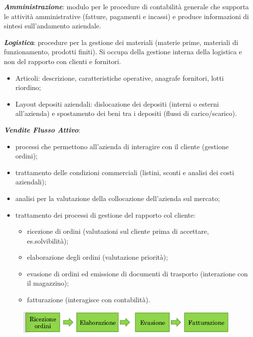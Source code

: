 \documentclass[a4paper, notitlepage, 9pt]{extreport}
\begin{document}
\noindent
\textit{\textbf{Amministrazione}}: modulo per le procedure di contabilità generale che supporta le attività amministrative (fatture, pagamenti e incassi) e produce informazioni di sintesi sull’andamento aziendale.

\noindent
\textit{\textbf{Logistica}}: procedure per la gestione dei materiali (materie prime, materiali di funzionamento, prodotti finiti). Si occupa della gestione interna della logistica e non del rapporto con clienti e fornitori.
\begin{itemize}
	\item Articoli: descrizione, caratteristiche operative, anagrafe fornitori, lotti riordino;
	\item Layout depositi aziendali: dislocazione dei depositi (interni o esterni all'azienda) e spostamento dei beni tra i depositi (flussi di carico/scarico).
\end{itemize}

\noindent
\textit{\textbf{Vendite Flusso Attivo}}:
	\begin{itemize}
		\item processi che permettono all’azienda di interagire con il cliente (gestione ordini);
		\item trattamento delle condizioni commerciali (listini, sconti e analisi dei costi aziendali);
		\item analisi per la valutazione della collocazione
		dell’azienda sul mercato;
		\item trattamento dei processi di gestione del rapporto col cliente:
		\begin{itemize}
			\item ricezione di ordini (valutazioni sul cliente prima di accettare, es.solvibilità);
			\item elaborazione degli ordini (valutazione priorità);
			\item evasione di ordini ed emissione di documenti di trasporto (interazione con il magazzino);
			\item fatturazione (interagisce con contabilità).
		\end{itemize}
	\end{itemize}
	\begin{figure}[H]
		\centering
		\includegraphics[scale=0.3]{Logistica}
	\end{figure}
	
\end{document}
